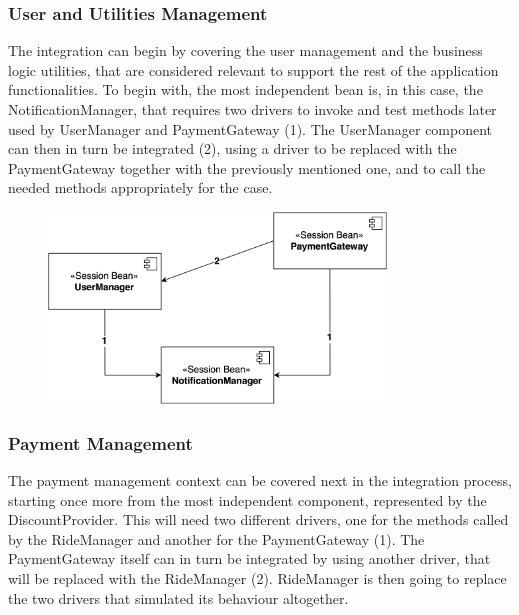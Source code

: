 \subsubsection{User and Utilities Management}
The integration can begin by covering the user management and the business logic utilities, that are considered relevant to support the rest of the application functionalities. To begin with, the most independent bean is, in this case, the NotificationManager, that requires two drivers to invoke and test methods later used by UserManager and PaymentGateway (1).
\noindent
The UserManager component can then in turn be integrated (2), using a driver to be replaced with the PaymentGateway together with the previously mentioned one, and to call the needed methods appropriately for the case.

\begin{figure}[H]
\begin{center}
		\includegraphics[width=0.8\textwidth]{./integration_strategy/diagrams/user_utilities.png}
\end{center}
\end{figure}

\subsubsection{Payment Management}
The payment management context can be covered next in the integration process, starting once more from the most independent component, represented by the DiscountProvider. This will need two different drivers, one for the methods called by the RideManager and another for the PaymentGateway (1).
\noindent
The PaymentGateway itself can in turn be integrated by using another driver, that will be replaced with the RideManager (2). RideManager is then going to replace the two drivers that simulated its behaviour altogether.

